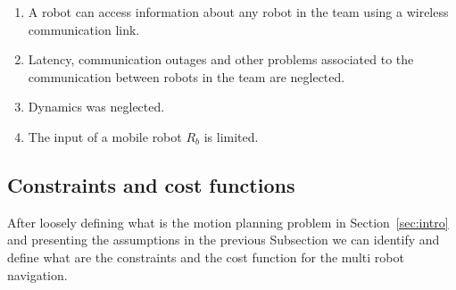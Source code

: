 \documentclass[eprint]{actapoly}
\begin{document}
\begin{enumerate}
    \item A robot can access 
    information about any robot in the team using 
    a wireless communication link.
    
    \item Latency, communication outages and other problems associated
    to the communication between robots in the team are neglected.
        
    \item Dynamics was neglected.
    
    \item The input of a mobile robot $R_b$ is limited.
    

%    

\end{enumerate}

\subsection{Constraints and cost functions}

After loosely defining what is the motion planning problem in
Section~\ref{sec:intro} and presenting the assumptions in the previous Subsection
we can identify and define what are the constraints and the cost function for the
multi robot navigation.
\end{document}
